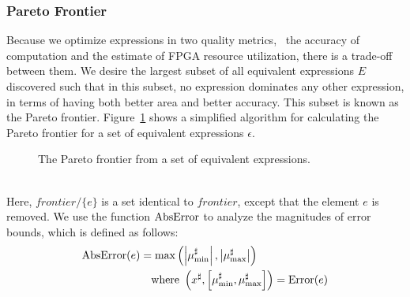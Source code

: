 \subsubsection{Pareto Frontier}

Because we optimize expressions in two quality metrics, \ie~the accuracy of
computation and the estimate of FPGA resource utilization, there is a trade-off
between them. We desire the largest subset of all equivalent expressions
$E$ discovered such that in this subset, no expression dominates any other
expression, in terms of having both better area and better accuracy. This
subset is known as the Pareto frontier.  Figure~\ref{so:alg:pareto} shows
a simplified algorithm for calculating the Pareto frontier for a set of
equivalent expressions $\epsilon$.
\begin{figure}[ht]
    \centering
    \begin{algorithmic}
                    \EndIf{}
                \EndFor{}
            \EndFor{}
        \EndFunction%
    \end{algorithmic}
    \caption{The Pareto frontier from a set of equivalent expressions.
    }\label{so:alg:pareto}
\end{figure} \\
Here, $\mathit{frontier} / \{ e \}$ is a set identical to $\mathit{frontier}$,
except that the element $e$ is removed.  We use the function $\operatorname{\mathrm{AbsError}}$ to
analyze the magnitudes of error bounds, which is defined as follows:
\begin{equation}
    \begin{aligned}
        \operatorname{\mathrm{AbsError}}(e) &= \max\left(
            \left| \mu^\sharp_{\min} \right|,
            \left| \mu^\sharp_{\max} \right|
        \right) \\
        & \quad \text{where~}
        \left(
            x^\sharp, \left[ \mu^\sharp_{\min}, \mu^\sharp_{\max} \right]
        \right) = \operatorname{\mathrm{Error}}(e)
    \end{aligned}
\end{equation}

